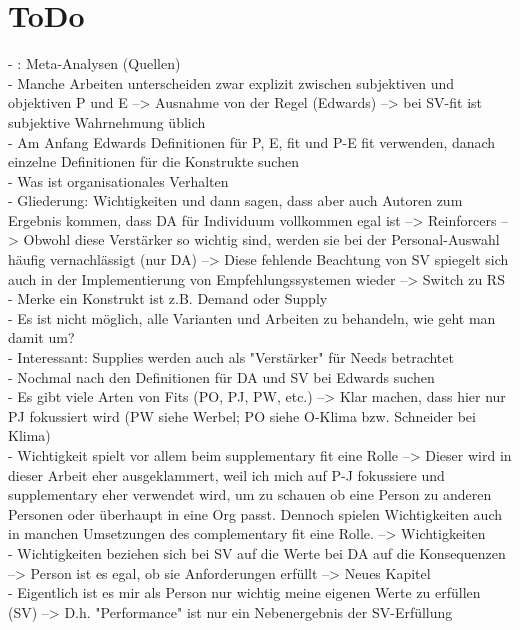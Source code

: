 \section{ToDo}
\label{ch:todo}
- \cite[S. 2]{edwards:2008}: Meta-Analysen (Quellen)\\
- Manche Arbeiten unterscheiden zwar explizit zwischen subjektiven und objektiven P und E --> Ausnahme von der Regel (Edwards) --> bei SV-fit ist subjektive Wahrnehmung üblich \\
- Am Anfang Edwards Definitionen für P, E, fit und P-E fit verwenden, danach einzelne Definitionen für die Konstrukte suchen \\
- Was ist organisationales Verhalten \\
- Gliederung: Wichtigkeiten und dann sagen, dass aber auch Autoren zum Ergebnis kommen, dass DA für Individuum vollkommen egal ist --> Reinforcers --> Obwohl diese Verstärker so wichtig sind, werden sie bei der Personal-Auswahl häufig vernachlässigt (nur DA) --> Diese fehlende Beachtung von SV spiegelt sich auch in der Implementierung von Empfehlungssystemen wieder --> Switch zu RS \\
- Merke ein Konstrukt ist z.B. Demand oder Supply \\
- Es ist nicht möglich, alle Varianten und Arbeiten zu behandeln, wie geht man damit um? \\
- Interessant: Supplies werden auch als "Verstärker" für Needs betrachtet \\
- Nochmal nach den Definitionen für DA und SV bei Edwards suchen \\
- Es gibt viele Arten von Fits (PO, PJ, PW, etc.) --> Klar machen, dass hier nur PJ fokussiert wird (PW siehe Werbel; PO siehe O-Klima bzw. Schneider bei Klima) \\
- Wichtigkeit spielt vor allem beim supplementary fit eine Rolle --> Dieser wird in dieser Arbeit eher ausgeklammert, weil ich mich auf P-J fokussiere und supplementary eher verwendet wird, um zu schauen ob eine Person zu anderen Personen oder überhaupt in eine Org passt. Dennoch spielen Wichtigkeiten auch in manchen Umsetzungen des complementary fit eine Rolle. --> Wichtigkeiten \\
- Wichtigkeiten beziehen sich bei SV auf die Werte bei DA auf die Konsequenzen --> Person ist es egal, ob sie Anforderungen erfüllt --> Neues Kapitel \\
- Eigentlich ist es mir als Person nur wichtig meine eigenen Werte zu erfüllen (SV) --> D.h. "Performance" ist nur ein Nebenergebnis der SV-Erfüllung \\
